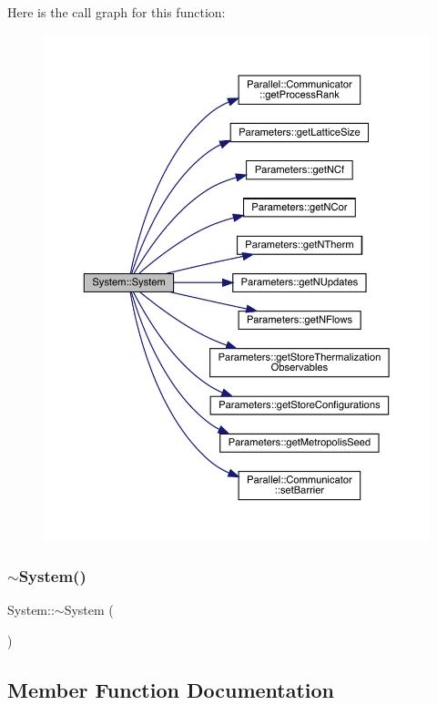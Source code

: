 Here is the call graph for this function\+:
\nopagebreak
\begin{figure}[H]
\begin{center}
\leavevmode
\includegraphics[width=350pt]{class_system_ae317936c9bcf1374d61745572e0f2f8a_cgraph}
\end{center}
\end{figure}
\mbox{\label{class_system_a3be70bb338e3f062f821173fd15680d0}} 
\subsubsection{\texorpdfstring{$\sim$System()}{~System()}}
{\footnotesize\ttfamily System\+::$\sim$\+System (\begin{DoxyParamCaption}{ }\end{DoxyParamCaption})}



\subsection{Member Function Documentation}
\mbox{\label{class_system_a93c8a8258ac8f6382ec393bca1271011}} 
